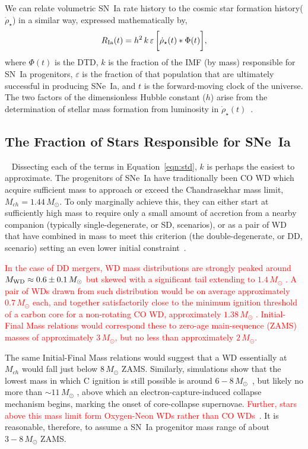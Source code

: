 \documentclass[apj, linenumbers]{aastex62}
\begin{document}
We can relate volumetric SN~Ia rate history to the cosmic star formation history($\dot{\rho}_{\star}$) in a similar way, expressed mathematically by, 
\begin{equation}
R_{\rm Ia}(t) =  h^2\,k\,\varepsilon\,\biggl[\dot{\rho}_{\star}(t) \ast \Phi(t)\biggr],
\label{eqn:std}
\end{equation}
\noindent where $\Phi(t)$ is the DTD, $k$ is the fraction of the IMF (by mass) responsible for SN~Ia progenitors, $\varepsilon$ is the fraction of that population that are ultimately successful in producing SNe~Ia, and $t$ is the forward-moving clock of the universe. The two factors of the dimensionless Hubble constant ($h$) arise from the determination of stellar mass formation from luminosity in $\dot{\rho}_{\star}(t)$~\citep[see][]{Croton:2013ty}.

\subsection{The Fraction of Stars Responsible for SNe~Ia}~\label{sec:wds}
Dissecting each of the terms in Equation~\ref{eqn:std}, $k$ is perhaps the easiest to approximate. The progenitors of SNe~Ia have traditionally been CO WD which acquire sufficient mass to approach or exceed the Chandrasekhar mass limit, $M_{ch}=1.44\,M_{\odot}$. To only marginally achieve this, they can either start at sufficiently high mass to require only a small amount of accretion from a nearby companion (typically single-degenerate, or SD, scenarios), or as a pair of WD that have combined in mass to meet this criterion (the double-degenerate, or DD, scenario) setting an even lower initial constraint~\cite[see][ for a review]{Maoz:2014fj}. 

\textcolor{red}{In the case of DD mergers, WD mass distributions are strongly peaked around $M_{\rm WD}\approx0.6\pm0.1\,M_{\odot}$ but skewed with a significant tail extending to $1.4\, M_{\odot}$ \citep{Catalan:2008il}. A pair of WDs drawn from such distribution would be on average approximately $0.7\, M_{\odot}$ each, and together satisfactorily close to the minimum ignition threshold of a carbon core for a non-rotating CO WD, approximately $1.38\, M_{\odot}$ \citep{Arnett:1969dw, Nomoto:1982vh,Pakmor:2013gf}. Initial-Final Mass relations \cite[e.g.,][]{Catalan:2008il,Cummings:2018oe} would correspond these to zero-age main-sequence (ZAMS) masses of approximately $3\, M_{\odot}$, but no less than approximately $2\, M_{\odot}$. }

The same Initial-Final Mass relations would suggest that a WD essentially at $M_{ch}$ would fall just below $8\, M_{\odot}$ ZAMS. Similarly, simulations show that the lowest mass in which C ignition is still possible is around $6-8 \,M_{\odot}$~\cite{Chen:2014rb,Denissenkov:2015rf}, but likely no more than $\sim11\, M_{\odot}$ \citep{Takahashi:2013jx}, above which an electron-capture-induced collapse mechanism begins, marking the onset of core-collapse supernovae. \textcolor{red}{Further, stars above this mass limit form Oxygen-Neon WDs rather than CO WDs~\citep{Doherty:2017qy}}. It is reasonable, therefore, to assume a SN~Ia progenitor mass range of about $3-8\,M_{\odot}$ ZAMS. 
\end{document}
